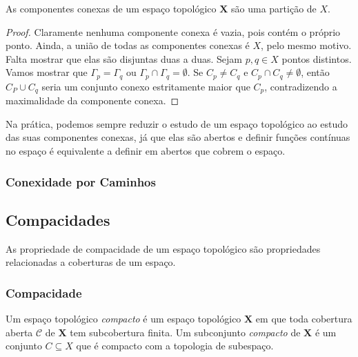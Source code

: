 \begin{prop}
As componentes conexas de um espaço topológico $\bm X$ são uma partição de $X$.
\end{prop}
\begin{proof}
Claramente nenhuma componente conexa é vazia, pois contém o próprio ponto. Ainda, a união de todas as componentes conexas é $X$, pelo mesmo motivo. Falta mostrar que elas são disjuntas duas a duas. Sejam $p,q \in X$ pontos distintos. Vamos mostrar que $\Gamma_p = \Gamma_q$ ou $\Gamma_p \cap \Gamma_q = \emptyset$. Se $C_p \neq C_q$ e $C_p \cap C_q \neq \emptyset$, então $C_P \cup C_q$ seria um conjunto conexo estritamente maior que $C_p$, contradizendo a maximalidade da componente conexa.
\end{proof}

Na prática, podemos sempre reduzir o estudo de um espaço topológico ao estudo das suas componentes conexas, já que elas são abertos e definir funções contínuas no espaço é equivalente a definir em abertos que cobrem o espaço.

\subsubsection{Conexidade por Caminhos}
























\subsection{Compacidades}

As propriedade de compacidade de um espaço topológico são propriedades relacionadas a coberturas de um espaço.

\subsubsection{Compacidade}

\begin{defi}
Um espaço topológico \emph{compacto} é um espaço topológico $\bm X$ em que toda cobertura aberta $\mathcal C$ de $\bm X$ tem subcobertura finita. Um subconjunto \emph{compacto} de $\bm X$ é um conjunto $C \subseteq X$ que é compacto com a topologia de subespaço.
\end{defi}

